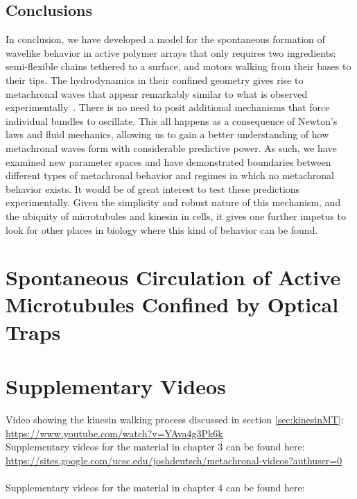 \documentclass[11pt]{ucthesis}
\begin{document}
\section{Conclusions}
In conclusion,
we have developed a model for the spontaneous formation of wavelike
behavior in active polymer arrays that only requires two ingredients:
semi-flexible chains tethered to a surface, and motors walking from
their bases to their tips. The hydrodynamics in their confined
geometry gives rise to metachronal waves that appear remarkably
similar to what is observed experimentally~\cite{Sanchez2011,sanchez2013engineering}.
There is no need to posit additional mechanisms that force
individual bundles to oscillate. This all happens as a consequence of Newton's
laws and fluid mechanics, allowing us to
gain a better understanding of how metachronal waves form with
considerable predictive power. As such, we have examined new parameter spaces and have
demonstrated boundaries between different types of metachronal
behavior and regimes in which no metachronal behavior exists.
It would be of great interest to test these predictions
experimentally.
Given the simplicity and robust nature of this mechanism, 
and the ubiquity of microtubules and kinesin in cells, it
gives one further impetus to look for other places in biology
where this kind of behavior can be found.


\chapter{Spontaneous Circulation of Active Microtubules Confined by Optical Traps}
\label{chap:opt_trap}

\nocite{*}



\appendix
\chapter{Supplementary Videos}
\noindent
Video showing the kinesin walking process discussed in section \ref{sec:kinesinMT}:\\
\url{https://www.youtube.com/watch?v=YAva4g3Pk6k}\\
Supplementary videos for the material in chapter 3 can be found here:\\
\url{https://sites.google.com/ucsc.edu/joshdeutsch/metachronal-videos?authuser=0}\\ \\
Supplementary videos for the material in chapter 4 can be found here:
\end{document}
